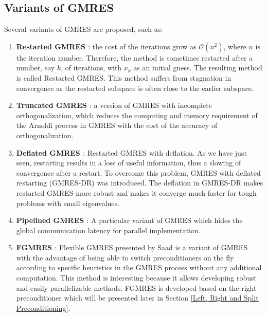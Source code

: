 \subsection{Variants of GMRES}

Several variants of GMRES are proposed, such as:

\begin{enumerate}
	\item \textbf{Restarted GMRES \cite{morgan1995restarted}}: the cost of the iterations grow as $\mathcal{O}(n^2)$, where $n$ is the iteration number. Therefore, the method is sometimes restarted after a number, say $k$, of iterations, with $x_k$ as an initial guess. The resulting method is called Restarted GMRES. This method suffers from stagnation in convergence as the restarted subspace is often close to the earlier subspace.
	
	\item \textbf{Truncated GMRES \cite{de1999truncation}}: a version of GMRES with incomplete orthogonalization, which reduces the computing and memory requirement of the Arnoldi process in GMRES with the cost of the accuracy of orthogonalization.
	
	\item \textbf{Deflated GMRES \cite{erhel1996restarted}}: Restarted GMRES with deflation. As we have just seen, restarting results in a loss of useful information, thus a slowing of convergence after a restart. To overcome this problem, GMRES with deflated restarting (GMRES-DR) was introduced. The deflation in GMRES-DR makes restarted GMRES more robust and makes it converge much faster for tough problems with small eigenvalues.
	
	\item \textbf{Pipelined GMRES \cite{ghysels2014hiding}}: A particular variant of GMRES which hides the global communication latency for parallel implementation.
	
	\item \textbf{FGMRES \cite{fraysse2008algorithm}}: Flexible GMRES presented by Saad is a variant of GMRES with the advantage of being able to switch preconditioners on the fly according to specific heuristics in the GMRES process without any additional computation. This method is interesting because it allows developing robust and easily parallelizable methods. FGMRES is developed based on the right-preconditioner which will be presented later in Section \ref{Left, Right and Split Preconditioning}.
	
\end{enumerate}


